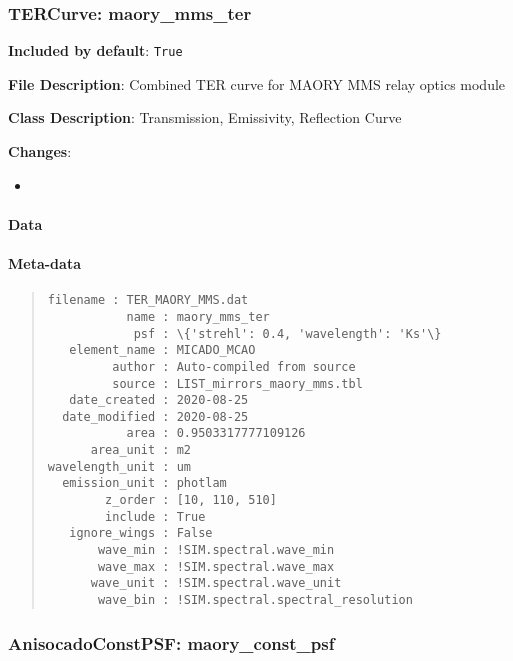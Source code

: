 \subsubsection{TERCurve: \textquotedbl{}maory\_mms\_ter\textquotedbl{}%
  \label{tercurve-maory-mms-ter}%
}

\textbf{Included by default}: \texttt{True}

\textbf{File Description}: Combined TER curve for MAORY MMS relay optics module

\textbf{Class Description}: Transmission, Emissivity, Reflection Curve

\textbf{Changes}:

\begin{itemize}
\item \end{itemize}


\paragraph{Data%
  \label{data}%
}


\paragraph{Meta-data%
  \label{meta-data}%
}

\begin{quote}
\begin{alltt}
\begin{lstlisting}[frame=single]
       filename : TER_MAORY_MMS.dat
           name : maory_mms_ter
            psf : \{'strehl': 0.4, 'wavelength': 'Ks'\}
   element_name : MICADO_MCAO
         author : Auto-compiled from source
         source : LIST_mirrors_maory_mms.tbl
   date_created : 2020-08-25
  date_modified : 2020-08-25
           area : 0.9503317777109126
      area_unit : m2
wavelength_unit : um
  emission_unit : photlam
        z_order : [10, 110, 510]
        include : True
   ignore_wings : False
       wave_min : !SIM.spectral.wave_min
       wave_max : !SIM.spectral.wave_max
      wave_unit : !SIM.spectral.wave_unit
       wave_bin : !SIM.spectral.spectral_resolution
\end{lstlisting}
\end{alltt}
\end{quote}


\subsubsection{AnisocadoConstPSF: \textquotedbl{}maory\_const\_psf\textquotedbl{}%
  \label{anisocadoconstpsf-maory-const-psf}%
}

